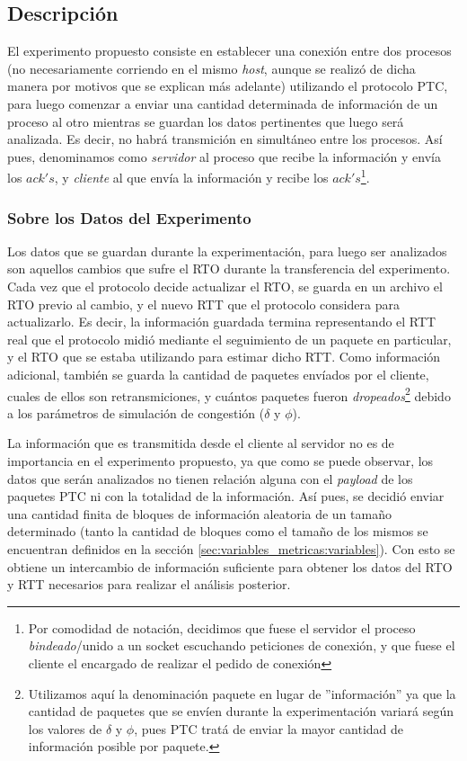 \subsection{Descripci\'on}\label{sec:experimento:descripcion}
\par El experimento propuesto consiste en establecer una conexi\'on entre dos
procesos (no necesariamente corriendo en el mismo \textit{host}, aunque se
realiz\'o de dicha manera por motivos que se explican m\'as adelante) utilizando
el protocolo PTC, para luego comenzar a enviar una cantidad determinada de
informaci\'on de un proceso al otro mientras se guardan los datos pertinentes
que luego ser\'a analizada. Es decir, no habr\'a transmici\'on en simult\'aneo
entre los procesos. As\'i pues, denominamos como \emph{servidor} al proceso que
recibe la informaci\'on y env\'ia los $ack's$, y \emph{cliente} al que env\'ia
la informaci\'on y recibe los $ack's$\footnote{Por comodidad de notaci\'on,
decidimos que fuese el servidor el proceso \textit{bindeado}/unido a un socket
escuchando peticiones de conexi\'on, y que fuese el cliente el encargado de
realizar el pedido de conexi\'on}.

\subsubsection*{Sobre los Datos del Experimento}
\par Los datos que se guardan durante la experimentaci\'on, para luego ser
analizados son aquellos cambios que sufre el RTO durante la transferencia del
experimento. Cada vez que el protocolo decide actualizar el RTO, se guarda en un
archivo el RTO previo al cambio, y el nuevo RTT que el protocolo considera para
actualizarlo. Es decir, la informaci\'on guardada termina representando el RTT
real que el protocolo midi\'o mediante el seguimiento de un paquete en
particular, y el RTO que se estaba utilizando para estimar dicho RTT. Como
informaci\'on adicional, tambi\'en se guarda la cantidad de paquetes env\'iados
por el cliente, cuales de ellos son retransmiciones, y cu\'antos paquetes fueron
\emph{dropeados}\footnote{Utilizamos aqu\'i la denominaci\'on paquete en lugar
de ''informaci\'on'' ya que la cantidad de paquetes que se env\'ien durante la
experimentaci\'on variar\'a seg\'un los valores de $\delta$ y $\phi$, pues PTC
trat\'a de enviar la mayor cantidad de informaci\'on posible por paquete.}
debido a los par\'ametros de simulaci\'on de congesti\'on ($\delta$ y $\phi$).

\par La informaci\'on que es transmitida desde el cliente al servidor no es de
importancia en el experimento propuesto, ya que como se puede observar, los
datos que ser\'an analizados no tienen relaci\'on alguna con el \emph{payload}
de los paquetes PTC ni con la totalidad de la informaci\'on. As\'i pues, se
decidi\'o enviar una cantidad finita de bloques de informaci\'on aleatoria de un
tama\~no determinado (tanto la cantidad de bloques como el tama\~no de los
mismos se encuentran definidos en la secci\'on
\ref{sec:variables_metricas:variables}). Con esto se obtiene un intercambio de
informaci\'on suficiente para obtener los datos del RTO y RTT necesarios para
realizar el an\'alisis posterior.

